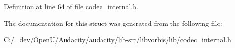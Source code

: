 Definition at line 64 of file codec\+\_\+internal.\+h.



The documentation for this struct was generated from the following file\+:\begin{DoxyCompactItemize}
\item 
C\+:/\+\_\+dev/\+Open\+U/\+Audacity/audacity/lib-\/src/libvorbis/lib/\hyperlink{codec__internal_8h}{codec\+\_\+internal.\+h}\end{DoxyCompactItemize}
